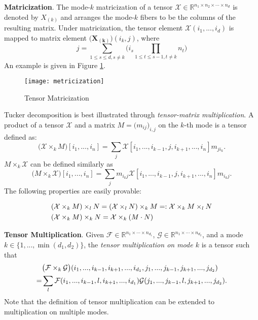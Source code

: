 {\bf Matricization}.
The mode-$k$ matricization of a tensor $\mathcal{X}\in\mathbb{R}^{n_1\times n_2\times\cdots\times n_d}$ is denoted by $X_{(k)}$ and arranges the mode-$k$ fibers to be the columns of the resulting matrix. Under matricization, the tensor element $\mathcal{X}(i_1,...,i_d)$ is mapped to matrix element $\big(\bm{X_{(k)}}\big)(i_k,j)$, where
\begin{equation}
j = \sum_{1\le s\le d, s\neq k}\big(i_s\prod_{1\le t\le s-1, t\neq k}n_t\big)
\end{equation}
An example is given in Figure \ref{fmat}.
\begin{figure}[H]\label{fmat}
\centering
\texttt{[image: metricization]}
\caption{Tensor Matricization}
\end{figure}

Tucker decomposition is best illustrated through \textit{tensor-matrix multiplication}. A product of a tensor $\mathcal{X}$ and a matrix $ M=\big(m_{ij}\big)_{i,j}$ on the $k$-th mode is a tensor defined as:
\begin{equation}
    \big(\mathcal{X}\times_kM\big)[i_1,...,i_n] = 
    \sum_j \mathcal{X}[i_1,...,i_{k-1},j,i_{k+1},...,i_n]m_{ji_k}.
\end{equation}
$M\times_k\mathcal{X}$ can be defined similarly as
\begin{equation}
    \big(M\times_k\mathcal{X}\big)[i_1,...,i_n] = 
    \sum_j m_{i_kj}\mathcal{X}[i_1,...,i_{k-1},j,i_{k+1},...,i_n]m_{i_kj}.
\end{equation}
The following properties are easily provable:
\begin{lemma}
\begin{equation}
\aligned
&(\mathcal{X}\times_k M)\times_l N = (\mathcal{X}\times_l N)\times_k M =: \mathcal{X}\times_k M\times_l N\\
&(\mathcal{X}\times_k M)\times_k N = \mathcal{X}\times_k(M\cdot N)
\endaligned
\end{equation}
\end{lemma}

{\bf Tensor Multiplication}.
Given $\mathcal{F}\in\mathbb{R}^{n_1\times\cdots\times n_{d_1}}$, $\mathcal{G}\in\mathbb{R}^{n_1\times\cdots\times n_{d_2}}$, and a mode $k\in\{1,...,\min(d_1,d_2)\}$, the \textit{tensor multiplication on mode $k$} is a tensor such that
\begin{equation}
\aligned
&\big(\mathcal{F}\times_k\mathcal{G}\big)(i_1,...,i_{k-1},i_{k+1},...,i_{d_1},j_1,...,j_{k-1},j_{k+1},...,j_{d_2}) \\
=& \sum_l \mathcal{F}(i_1,...,i_{k-1},l,i_{k+1},...,i_{d_1})\mathcal{G}(j_1,...,j_{k-1},l,j_{k+1},...,j_{d_2}).
\endaligned
\end{equation}
Note that the definition of tensor multiplication can be extended to multiplication on multiple modes.

